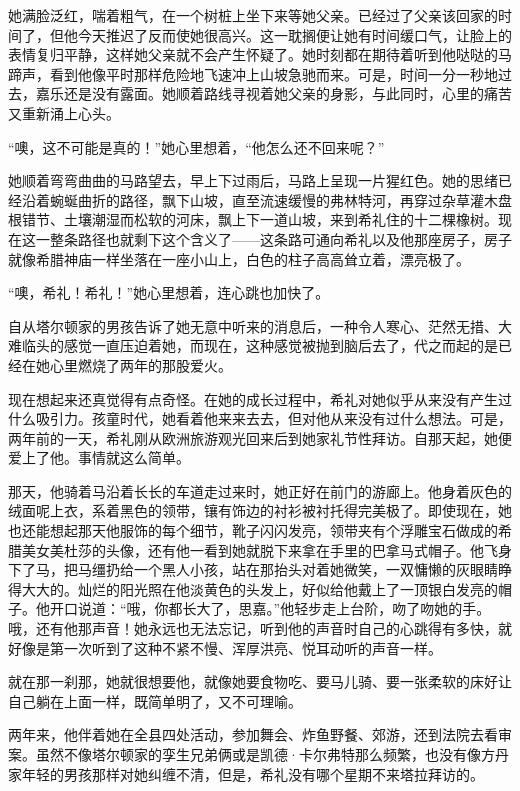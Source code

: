 \par 她满脸泛红，喘着粗气，在一个树桩上坐下来等她父亲。已经过了父亲该回家的时间了，但他今天推迟了反而使她很高兴。这一耽搁便让她有时间缓口气，让脸上的表情复归平静，这样她父亲就不会产生怀疑了。她时刻都在期待着听到他哒哒的马蹄声，看到他像平时那样危险地飞速冲上山坡急驰而来。可是，时间一分一秒地过去，嘉乐还是没有露面。她顺着路线寻视着她父亲的身影，与此同时，心里的痛苦又重新涌上心头。
\par “噢，这不可能是真的！”她心里想着，“他怎么还不回来呢？”
\par 她顺着弯弯曲曲的马路望去，早上下过雨后，马路上呈现一片猩红色。她的思绪已经沿着蜿蜒曲折的路径，飘下山坡，直至流速缓慢的弗林特河，再穿过杂草灌木盘根错节、土壤潮湿而松软的河床，飘上下一道山坡，来到希礼住的十二棵橡树。现在这一整条路径也就剩下这个含义了——这条路可通向希礼以及他那座房子，房子就像希腊神庙一样坐落在一座小山上，白色的柱子高高耸立着，漂亮极了。
\par “噢，希礼！希礼！”她心里想着，连心跳也加快了。
\par 自从塔尔顿家的男孩告诉了她无意中听来的消息后，一种令人寒心、茫然无措、大难临头的感觉一直压迫着她，而现在，这种感觉被抛到脑后去了，代之而起的是已经在她心里燃烧了两年的那股爱火。
\par 现在想起来还真觉得有点奇怪。在她的成长过程中，希礼对她似乎从来没有产生过什么吸引力。孩童时代，她看着他来来去去，但对他从来没有过什么想法。可是，两年前的一天，希礼刚从欧洲旅游观光回来后到她家礼节性拜访。自那天起，她便爱上了他。事情就这么简单。
\par 那天，他骑着马沿着长长的车道走过来时，她正好在前门的游廊上。他身着灰色的绒面呢上衣，系着黑色的领带，镶有饰边的衬衫被衬托得完美极了。即使现在，她也还能想起那天他服饰的每个细节，靴子闪闪发亮，领带夹有个浮雕宝石做成的希腊美女美杜莎的头像，还有他一看到她就脱下来拿在手里的巴拿马式帽子。他飞身下了马，把马缰扔给一个黑人小孩，站在那抬头对着她微笑，一双慵懒的灰眼睛睁得大大的。灿烂的阳光照在他淡黄色的头发上，好似给他戴上了一顶银白发亮的帽子。他开口说道：“哦，你都长大了，思嘉。”他轻步走上台阶，吻了吻她的手。哦，还有他那声音！她永远也无法忘记，听到他的声音时自己的心跳得有多快，就好像是第一次听到了这种不紧不慢、浑厚洪亮、悦耳动听的声音一样。
\par 就在那一刹那，她就很想要他，就像她要食物吃、要马儿骑、要一张柔软的床好让自己躺在上面一样，既简单明了，又不可理喻。
\par 两年来，他伴着她在全县四处活动，参加舞会、炸鱼野餐、郊游，还到法院去看审案。虽然不像塔尔顿家的孪生兄弟俩或是凯德·卡尔弗特那么频繁，也没有像方丹家年轻的男孩那样对她纠缠不清，但是，希礼没有哪个星期不来塔拉拜访的。
